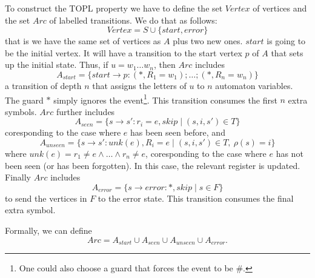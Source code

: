 \newcommand{\Vertex}{\mathit{Vertex}}
\newcommand{\Arc}{\mathit{Arc}}
\newcommand{\sstart}{\mathit{start}}
\newcommand{\serror}{\mathit{error}}
\newcommand{\seen}{\mathit{seen}}
\newcommand{\unseen}{\mathit{unseen}}
To construct the TOPL property we have to define the set $\Vertex$
of vertices and the set $\Arc$ of labelled transitions. We do that as follows:
\[
\Vertex = S \cup \{\sstart, \serror\}
\]
that is we have the same set of vertices as $A$ plus two new
ones. $start$ is going to be the initial vertex. It will have a
transition to the start vertex $p$ of $A$ that sets up the
initial state. Thus, if $u = w_1\ldots w_n$, then $\Arc$ includes
\[
A_{\sstart} = \{\sstart \to p: (*,R_1=w_1);\ldots;(*,R_n=w_n) \}
\]
a transition of depth $n$ that assigns the letters of $u$
to $n$ automaton variables. The guard $*$ simply ignores the
event\footnote{One could also choose a guard that forces the event
to be \#.}. This transition consumes the first $n$ extra
symbols. $\Arc$ further includes
\[
A_{\seen} = \{s\to s': r_i=e, skip \mid (s, i, s') \in T \}
\]
coresponding to the case where $e$ has been seen before, and
\[
A_{\unseen} =\{ s\to s': unk(e), R_i=e \mid (s, i, s') \in T,\ \rho(s)=i \}
\]
where $unk(e) = r_1 \neq e \land \ldots \land r_n \neq e$,
coresponding to the case where $e$ has not been seen (or has been
forgotten). In this case, the relevant register is
updated. Finally $\Arc$ includes
\[
A_{\serror} = \{s\to \serror: *, skip \mid s\in F \}
\]
to send the vertices in $F$ to the error state. This transition
consumes the final extra symbol.

Formally, we can define
\[
\Arc = A_{\sstart} \cup A_{\seen} \cup A_{\unseen} \cup A_{\serror}.
\]
